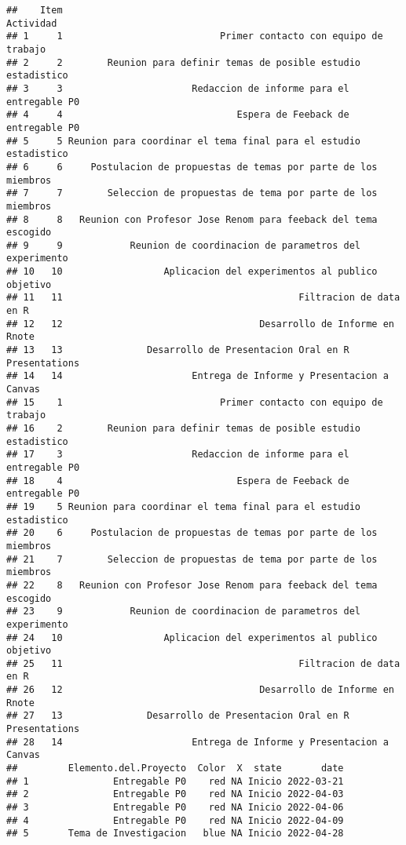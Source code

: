 \documentclass[
]{article}
\begin{document}
\begin{verbatim}
##    Item                                                        Actividad
## 1     1                            Primer contacto con equipo de trabajo
## 2     2        Reunion para definir temas de posible estudio estadistico
## 3     3                       Redaccion de informe para el entregable P0
## 4     4                               Espera de Feeback de entregable P0
## 5     5 Reunion para coordinar el tema final para el estudio estadistico
## 6     6     Postulacion de propuestas de temas por parte de los miembros
## 7     7        Seleccion de propuestas de tema por parte de los miembros
## 8     8   Reunion con Profesor Jose Renom para feeback del tema escogido
## 9     9            Reunion de coordinacion de parametros del experimento
## 10   10                  Aplicacion del experimentos al publico objetivo
## 11   11                                          Filtracion de data en R
## 12   12                                   Desarrollo de Informe en Rnote
## 13   13               Desarrollo de Presentacion Oral en R Presentations
## 14   14                       Entrega de Informe y Presentacion a Canvas
## 15    1                            Primer contacto con equipo de trabajo
## 16    2        Reunion para definir temas de posible estudio estadistico
## 17    3                       Redaccion de informe para el entregable P0
## 18    4                               Espera de Feeback de entregable P0
## 19    5 Reunion para coordinar el tema final para el estudio estadistico
## 20    6     Postulacion de propuestas de temas por parte de los miembros
## 21    7        Seleccion de propuestas de tema por parte de los miembros
## 22    8   Reunion con Profesor Jose Renom para feeback del tema escogido
## 23    9            Reunion de coordinacion de parametros del experimento
## 24   10                  Aplicacion del experimentos al publico objetivo
## 25   11                                          Filtracion de data en R
## 26   12                                   Desarrollo de Informe en Rnote
## 27   13               Desarrollo de Presentacion Oral en R Presentations
## 28   14                       Entrega de Informe y Presentacion a Canvas
##         Elemento.del.Proyecto  Color  X  state       date
## 1               Entregable P0    red NA Inicio 2022-03-21
## 2               Entregable P0    red NA Inicio 2022-04-03
## 3               Entregable P0    red NA Inicio 2022-04-06
## 4               Entregable P0    red NA Inicio 2022-04-09
## 5       Tema de Investigacion   blue NA Inicio 2022-04-28

\end{verbatim}
\end{document}
